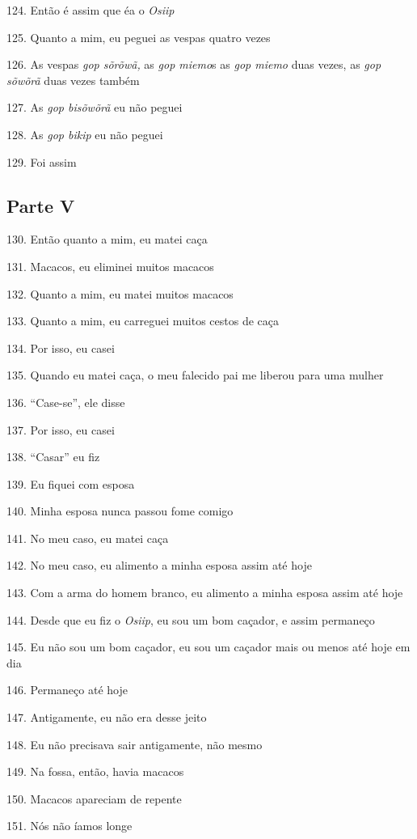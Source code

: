 124. Então é assim que éa o \emph{Osiip}

125. Quanto a mim, eu peguei as vespas quatro vezes

126. As vespas \emph{gop sõrõwã,} as \emph{gop miemo}s as \emph{gop
miemo} duas vezes, as \emph{gop sõwõrã} duas vezes também

127. As \emph{gop bisõwõrã} eu não peguei

128. As \emph{gop bikip} eu não peguei

129. Foi assim

\subsection{Parte V}

130. Então quanto a mim, eu matei caça

131. Macacos, eu eliminei muitos macacos

132. Quanto a mim, eu matei muitos macacos

133. Quanto a mim, eu carreguei muitos cestos de caça

134. Por isso, eu casei

135. Quando eu matei caça, o meu falecido pai me liberou para uma mulher

136. ``Case-se'', ele disse

137. Por isso, eu casei

138. ``Casar'' eu fiz

139. Eu fiquei com esposa

140.  Minha esposa nunca passou fome comigo

141. No meu caso, eu matei caça

142. No meu caso, eu alimento a minha esposa assim até hoje

143. Com a arma do homem branco, eu alimento a minha esposa assim até
hoje

144. Desde que eu fiz o \emph{Osiip}, eu sou um bom caçador, e assim
permaneço

145. Eu não sou um bom caçador, eu sou um caçador mais ou menos até hoje
em dia

146. Permaneço até hoje

147. Antigamente, eu não era desse jeito

148. Eu não precisava sair antigamente, não mesmo

149. Na fossa, então, havia macacos

150. Macacos apareciam de repente

151. Nós não íamos longe

